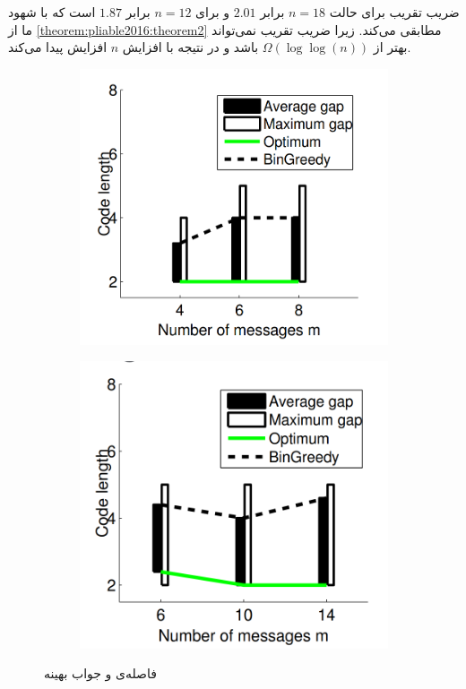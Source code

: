 	ضریب تقریب برای حالت
	$n = 18$
	برابر
	$2.01$
	و برای
	$n = 12$
	برابر
	$1.87$
	است که با شهود ما از
	\autoref{theorem:pliable2016:theorem2}
	مطابقی می‌کند. زیرا ضریب تقریب نمی‌تواند بهتر از
	$\Omega(\log \log (n))$
	باشد و در نتیجه با افزایش
	$n$
	افزایش پیدا می‌کند.
 \begin{figure}
	\centering
	\begin{subfigure}[b]{0.45\textwidth}
		\centering
		\includegraphics[width=1\linewidth]{figs/ch3/pliable2016_3a}
		\caption{}
		\label{fig:pliable20163a}
	\end{subfigure}
	\hfill
	\begin{subfigure}[b]{0.45\textwidth}
		\centering
		\includegraphics[width=1\linewidth]{figs/ch3/pliable2016_3b}
		\caption{}
		\label{fig:pliable20163b}
	\end{subfigure}
	\caption{
		فاصله‌ی 
		و جواب بهینه
	}
	\label{fig:pliable20163}
\end{figure}








